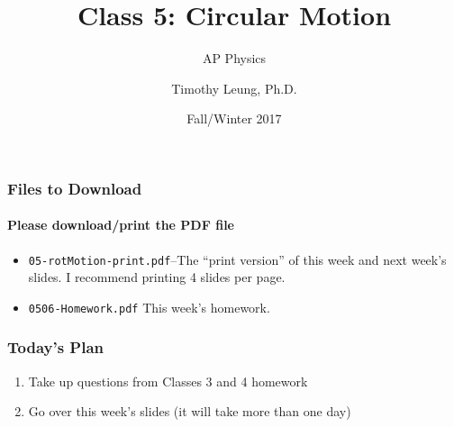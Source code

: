 \documentclass[12pt,compress,aspectratio=169]{beamer}
\title{Class 5: Circular Motion}
\subtitle{AP Physics}
\author[TML]{Timothy Leung, Ph.D.}
\institute{Olympiads School}
\date{Fall/Winter 2017}
\begin{document}
\begin{frame}
  \maketitle
\end{frame}

\begin{frame}
  \frametitle{Files to Download}
  \framesubtitle{Please download/print the PDF file}
  \begin{itemize}
  \item\texttt{05-rotMotion-print.pdf}--The ``print version'' of this week
    and next week's slides. I recommend printing 4 slides per page.
  \item\texttt{0506-Homework.pdf} This week's homework.
  \end{itemize}
\end{frame}


\begin{frame}
  \frametitle{Today's Plan}
  \begin{enumerate}
  \item Take up questions from Classes 3 and 4 homework
  \item Go over this week's slides (it will take more than one day)
  \end{enumerate}
\end{frame}
\end{document}
